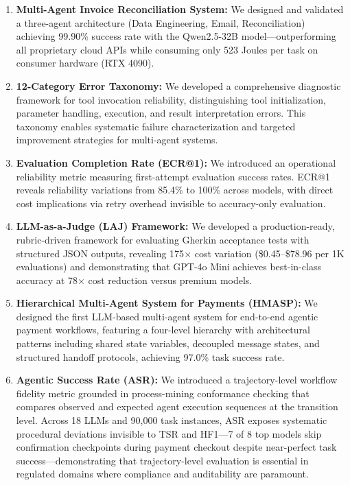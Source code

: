 \begin{enumerate}[leftmargin=*]
    \item \textbf{Multi-Agent Invoice Reconciliation System:} We designed and validated a three-agent architecture (Data Engineering, Email, Reconciliation) achieving 99.90\% success rate with the Qwen2.5-32B model---outperforming all proprietary cloud APIs while consuming only 523 Joules per task on consumer hardware (RTX 4090).
    
    \item \textbf{12-Category Error Taxonomy:} We developed a comprehensive diagnostic framework for tool invocation reliability, distinguishing tool initialization, parameter handling, execution, and result interpretation errors. This taxonomy enables systematic failure characterization and targeted improvement strategies for multi-agent systems.
    
    \item \textbf{Evaluation Completion Rate (ECR@1):} We introduced an operational reliability metric measuring first-attempt evaluation success rates. ECR@1 reveals reliability variations from 85.4\% to 100\% across models, with direct cost implications via retry overhead invisible to accuracy-only evaluation.
    
    \item \textbf{LLM-as-a-Judge (LAJ) Framework:} We developed a production-ready, rubric-driven framework for evaluating Gherkin acceptance tests with structured JSON outputs, revealing 175$\times$ cost variation (\$0.45--\$78.96 per 1K evaluations) and demonstrating that GPT-4o Mini achieves best-in-class accuracy at 78$\times$ cost reduction versus premium models.
    
    \item \textbf{Hierarchical Multi-Agent System for Payments (HMASP):} We designed the first LLM-based multi-agent system for end-to-end agentic payment workflows, featuring a four-level hierarchy with architectural patterns including shared state variables, decoupled message states, and structured handoff protocols, achieving 97.0\% task success rate.
    
    \item \textbf{Agentic Success Rate (ASR):} We introduced a trajectory-level workflow fidelity metric grounded in process-mining conformance checking that compares observed and expected agent execution sequences at the transition level. Across 18 LLMs and 90{,}000 task instances, ASR exposes systematic procedural deviations invisible to TSR and HF1---7 of 8 top models skip confirmation checkpoints during payment checkout despite near-perfect task success---demonstrating that trajectory-level evaluation is essential in regulated domains where compliance and auditability are paramount.
\end{enumerate}

